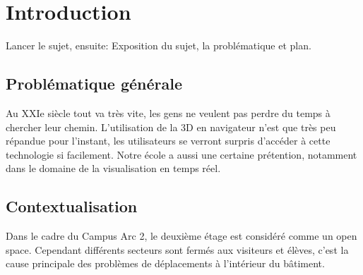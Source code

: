 \chapter{Introduction}
Lancer le sujet, ensuite:
Exposition du sujet, la problématique et plan.

\section{Problématique générale}
Au XXIe siècle tout va très vite, les gens ne veulent pas perdre du temps à chercher leur chemin. L'utilisation de la 3D en navigateur n'est que très peu répandue pour l'instant, les utilisateurs se verront surpris d'accéder à cette technologie si facilement. Notre école a aussi une certaine prétention, notamment dans le domaine de la visualisation en temps réel.




\section{Contextualisation}
Dans le cadre du Campus Arc 2, le deuxième étage est considéré comme un open space. Cependant différents secteurs sont fermés aux visiteurs et élèves, c'est la cause principale des problèmes de déplacements à l'intérieur du bâtiment.
